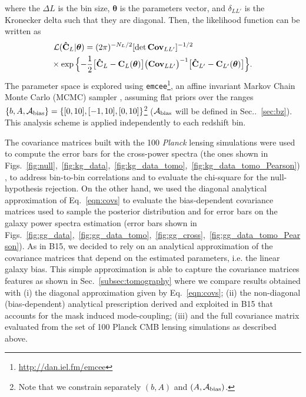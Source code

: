 %
where the $\Delta L$ is the bin size, $\boldsymbol{\theta}$ is the parameters vector, and
$\delta_{LL'}$ is the Kronecker delta such that they are diagonal.
Then, the likelihood function can be written as
%
\begin{equation}
\begin{split}
\mathcal{L}&(\mathbf{\hat{C}}_{L}|\boldsymbol{\theta}) = (2\pi)^{-N_L/2} [\text{det}\, \textbf{Cov}_{LL'}]^{-1/2} \\
\!\!\!\!\!\!&\!\!\!\!\!\!\times \exp{ \Bigl\{ -\frac{1}{2} \bigl[ \mathbf{\hat{C}}_{L} - \mathbf{C}_{L}(\boldsymbol{\theta})  \bigr]
\bigl(\textbf{Cov}_{LL'}\bigr)^{-1} \bigl[ \mathbf{\hat{C}}_{L'} - \mathbf{C}_{L'}(\boldsymbol{\theta})  \bigr]  \Bigr\}}.
\end{split}
\end{equation}
%
The parameter space is explored using \texttt{emcee}\footnote{\url{http://dan.iel.fm/emcee}}, an affine invariant Markov Chain Monte
Carlo (MCMC) sampler \citep{Foreman-Mackey2013}, assuming flat priors over the ranges $\{b,A, \mathcal{A}_{\rm{bias}}\} = \{[0,10], [-1, 10], [0, 10] \}$\footnote{Note that we constrain separately $(b,A)$ and $(A, \mathcal{A}_{\rm{bias}})$.} ($\mathcal{A}_{\rm{bias}}$ will be defined in Sec..~\eqref{sec:bz}). This analysis scheme is applied independently to each redshift bin.

The covariance matrices built with the 100 \textit{Planck} lensing simulations were used to compute the error bars for the cross-power spectra (the ones shown in Figs.~\eqref{fig:null},~\eqref{fig:kg_data},~\eqref{fig:kg_data_tomo},~\eqref{fig:kg_data_tomo_Pearson}), to address bin-to-bin correlations and to evaluate the chi-square for the null-hypothesis rejection. On the other hand, we used the diagonal analytical approximation of Eq.~\eqref{eqn:covs} to evaluate the bias-dependent covariance matrices used to sample the posterior distribution and for error bars on the galaxy power spectra estimation (error bars shown in Figs.~\eqref{fig:gg_data},~\eqref{fig:gg_data_tomo},~\eqref{fig:gg_cross},~\eqref{fig:gg_data_tomo_Pearson}). As in B15, we decided to rely on an analytical approximation of the covariance matrices that depend on the estimated parameters, i.e. the linear galaxy bias. This simple approximation is able to capture the covariance matrices features as shown in Sec.~\eqref{subsec:tomography} where we compare results obtained with (i) the diagonal approximation given by Eq.~\eqref{eqn:covs}; (ii) the non-diagonal (bias-dependent) analytical prescription derived and exploited in B15 that accounts for the mask induced mode-coupling; (iii) and the full covariance matrix evaluated from the set of 100 Planck CMB lensing simulations as described above.


